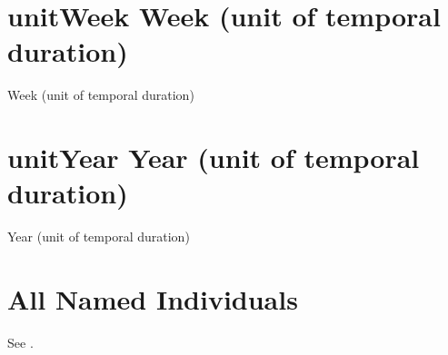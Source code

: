 \documentclass[letterpaper,10pt,english]{sphinxmanual}
\begin{document}
\section{unitWeek \sphinxhyphen{} Week (unit of temporal duration)}
\label{\detokenize{doc-unitWeek:unitweek-week-unit-of-temporal-duration}}\label{\detokenize{doc-unitWeek:index-0}}\label{\detokenize{doc-unitWeek::doc}}
\begin{sphinxShadowBox}

\sphinxAtStartPar
Week (unit of temporal duration)
\end{sphinxShadowBox}
\begin{quote}
\label{\detokenize{doc-unitYear:unityear}}\label{\detokenize{doc-unitYear:year-unit-of-temporal-duration}}\label{\detokenize{doc-unitYear:unityear}}
\ignorespaces \end{quote}


\section{unitYear \sphinxhyphen{} Year (unit of temporal duration)}
\label{\detokenize{doc-unitYear:unityear-year-unit-of-temporal-duration}}\label{\detokenize{doc-unitYear:index-0}}\label{\detokenize{doc-unitYear::doc}}
\begin{sphinxShadowBox}

\sphinxAtStartPar
Year (unit of temporal duration)
\end{sphinxShadowBox}


\section{All Named Individuals}
\label{\detokenize{named-individuals:all-named-individuals}}
\sphinxAtStartPar
See {\hyperref[\detokenize{named-individuals:table-9}]{}}.
\end{document}
